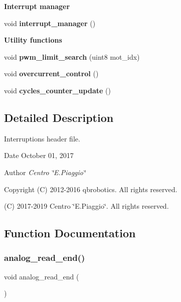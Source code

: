 \begin{Indent}\textbf{ Interrupt manager}\par
\begin{DoxyCompactItemize}
\item 
void \textbf{ interrupt\+\_\+manager} ()
\end{DoxyCompactItemize}
\end{Indent}
\begin{Indent}\textbf{ Utility functions}\par
\begin{DoxyCompactItemize}
\item 
void \textbf{ pwm\+\_\+limit\+\_\+search} (uint8 mot\+\_\+idx)
\item 
void \textbf{ overcurrent\+\_\+control} ()
\item 
void \textbf{ cycles\+\_\+counter\+\_\+update} ()
\end{DoxyCompactItemize}
\end{Indent}


\subsection{Detailed Description}
Interruptions header file. 

\begin{DoxyDate}{Date}
October 01, 2017 
\end{DoxyDate}
\begin{DoxyAuthor}{Author}
{\itshape Centro \char`\"{}\+E.\+Piaggio\char`\"{}} 
\end{DoxyAuthor}
\begin{DoxyCopyright}{Copyright}
(C) 2012-\/2016 qbrobotics. All rights reserved. 

(C) 2017-\/2019 Centro \char`\"{}\+E.\+Piaggio\char`\"{}. All rights reserved. 
\end{DoxyCopyright}


\subsection{Function Documentation}
\mbox{\label{interruptions_8h_a00a8d34962a63161405e5d7785b9625e}} 
\subsubsection{analog\+\_\+read\+\_\+end()}
{\footnotesize\ttfamily void analog\+\_\+read\+\_\+end (\begin{DoxyParamCaption}{ }\end{DoxyParamCaption})}

